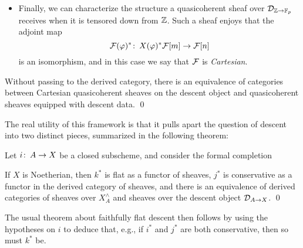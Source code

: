 \begin{itemize}
\item Finally, we can characterize the structure a quasicoherent sheaf over $\mathcal{D}_{\mathbb Z \to \mathbb F_p}$ receives when it is tensored down from $\mathbb Z$.  Such a sheaf enjoys that the adjoint map \[\mathcal{F}(\varphi)^* \colon\thinspace X(\varphi)^* \mathcal{F}[m] \to \mathcal{F}[n]\] is an isomorphism, and in this case we say that $\mathcal{F}$ is \textit{Cartesian}.
\end{itemize}

\begin{lemma}
Without passing to the derived category, there is an equivalence of categories between Cartesian quasicoherent sheaves on the descent object and quasicoherent sheaves equipped with descent data. \qed
\end{lemma}

The real utility of this framework is that it pulls apart the question of descent into two distinct pieces, summarized in the following theorem:
\begin{theorem}\label{AlgebraicCompletionSituation}
Let $i\colon\thinspace A \to X$ be a closed subscheme, and consider the formal completion
\begin{center}
\end{center}
If $X$ is Noetherian, then $k^*$ is flat as a functor of sheaves, $j^*$ is conservative as a functor in the derived category of sheaves, and there is an equivalence of derived categories of sheaves over $X^\wedge_A$ and sheaves over the descent object $\mathcal{D}_{A \to X}$. \qed
\end{theorem}

\begin{remark}
The usual theorem about faithfully flat descent then follows by using the hypotheses on $i$ to deduce that, e.g., if $i^*$ and $j^*$ are both conservative, then so must $k^*$ be.
\end{remark}

